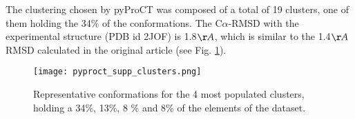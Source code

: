 
The clustering chosen by pyProCT was composed of a total of 19 clusters,
one of them holding the 34\% of the conformations. The C$\alpha$-RMSD
with the experimental structure (PDB id 2JOF) is 1.8${\AA}$, which
is similar to the 1.4${\AA}$ RMSD calculated in the original article
(see Fig. \ref{fig:clusters}). 

\begin{figure}
\texttt{[image: pyproct\_supp\_clusters.png]}

\protect\caption{Representative conformations for the 4 most populated clusters, holding
a 34\%, 13\%, 8 \% and 8\% of the elements of the dataset. \label{fig:clusters}}
\end{figure}

